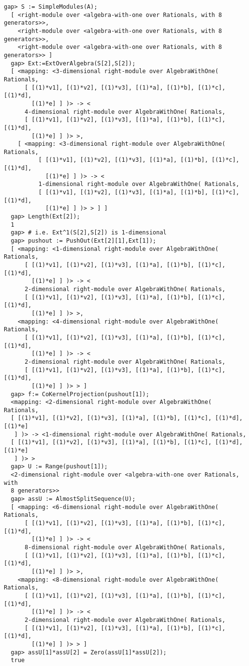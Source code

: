 \documentclass[a4paper,11pt]{report}
\begin{document}
{{ 
\begin{Verbatim}[fontsize=\small,frame=single,label=Example]
  gap> S := SimpleModules(A);
  [ <right-module over <algebra-with-one over Rationals, with 8 generators>>, 
    <right-module over <algebra-with-one over Rationals, with 8 generators>>, 
    <right-module over <algebra-with-one over Rationals, with 8 generators>> ]
  gap> Ext:=ExtOverAlgebra(S[2],S[2]);
  [ <mapping: <3-dimensional right-module over AlgebraWithOne( Rationals, 
      [ [(1)*v1], [(1)*v2], [(1)*v3], [(1)*a], [(1)*b], [(1)*c], [(1)*d], 
        [(1)*e] ] )> -> <
      4-dimensional right-module over AlgebraWithOne( Rationals, 
      [ [(1)*v1], [(1)*v2], [(1)*v3], [(1)*a], [(1)*b], [(1)*c], [(1)*d], 
        [(1)*e] ] )> >, 
    [ <mapping: <3-dimensional right-module over AlgebraWithOne( Rationals, 
          [ [(1)*v1], [(1)*v2], [(1)*v3], [(1)*a], [(1)*b], [(1)*c], [(1)*d], 
            [(1)*e] ] )> -> <
          1-dimensional right-module over AlgebraWithOne( Rationals, 
          [ [(1)*v1], [(1)*v2], [(1)*v3], [(1)*a], [(1)*b], [(1)*c], [(1)*d], 
            [(1)*e] ] )> > ] ]
  gap> Length(Ext[2]);
  1
  gap> # i.e. Ext^1(S[2],S[2]) is 1-dimensional
  gap> pushout := PushOut(Ext[2][1],Ext[1]);   
  [ <mapping: <1-dimensional right-module over AlgebraWithOne( Rationals, 
      [ [(1)*v1], [(1)*v2], [(1)*v3], [(1)*a], [(1)*b], [(1)*c], [(1)*d], 
        [(1)*e] ] )> -> <
      2-dimensional right-module over AlgebraWithOne( Rationals, 
      [ [(1)*v1], [(1)*v2], [(1)*v3], [(1)*a], [(1)*b], [(1)*c], [(1)*d], 
        [(1)*e] ] )> >, 
    <mapping: <4-dimensional right-module over AlgebraWithOne( Rationals, 
      [ [(1)*v1], [(1)*v2], [(1)*v3], [(1)*a], [(1)*b], [(1)*c], [(1)*d], 
        [(1)*e] ] )> -> <
      2-dimensional right-module over AlgebraWithOne( Rationals, 
      [ [(1)*v1], [(1)*v2], [(1)*v3], [(1)*a], [(1)*b], [(1)*c], [(1)*d], 
        [(1)*e] ] )> > ]
  gap> f:= CoKernelProjection(pushout[1]);
  <mapping: <2-dimensional right-module over AlgebraWithOne( Rationals, 
  [ [(1)*v1], [(1)*v2], [(1)*v3], [(1)*a], [(1)*b], [(1)*c], [(1)*d], [(1)*e] 
   ] )> -> <1-dimensional right-module over AlgebraWithOne( Rationals, 
  [ [(1)*v1], [(1)*v2], [(1)*v3], [(1)*a], [(1)*b], [(1)*c], [(1)*d], [(1)*e] 
   ] )> >
  gap> U := Range(pushout[1]);            
  <2-dimensional right-module over <algebra-with-one over Rationals, with 
  8 generators>>
  gap> assU := AlmostSplitSequence(U);
  [ <mapping: <6-dimensional right-module over AlgebraWithOne( Rationals, 
      [ [(1)*v1], [(1)*v2], [(1)*v3], [(1)*a], [(1)*b], [(1)*c], [(1)*d], 
        [(1)*e] ] )> -> <
      8-dimensional right-module over AlgebraWithOne( Rationals, 
      [ [(1)*v1], [(1)*v2], [(1)*v3], [(1)*a], [(1)*b], [(1)*c], [(1)*d], 
        [(1)*e] ] )> >, 
    <mapping: <8-dimensional right-module over AlgebraWithOne( Rationals, 
      [ [(1)*v1], [(1)*v2], [(1)*v3], [(1)*a], [(1)*b], [(1)*c], [(1)*d], 
        [(1)*e] ] )> -> <
      2-dimensional right-module over AlgebraWithOne( Rationals, 
      [ [(1)*v1], [(1)*v2], [(1)*v3], [(1)*a], [(1)*b], [(1)*c], [(1)*d], 
        [(1)*e] ] )> > ]
  gap> assU[1]*assU[2] = Zero(assU[1]*assU[2]);
  true
\end{Verbatim}
 }

 }
\end{document}
